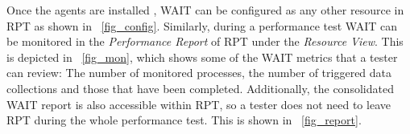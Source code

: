 \documentclass[runningheads,a4paper]{llncs}
\begin{document}
Once the agents are installed 
, WAIT can be configured as
any other resource in RPT as shown in \figurename ~\ref{fig_config}. Similarly,
during a performance test WAIT can be monitored %
in the
\emph{Performance Report} of RPT under the \emph{Resource View}. This is
depicted in \figurename ~\ref{fig_mon}, which shows some of the WAIT metrics
that a tester can review: The number of monitored processes, the number of triggered data collections
and those that have been completed. Additionally, the consolidated WAIT report
is also accessible within RPT, so a tester does not need to leave RPT during the
whole performance test. This is shown in \figurename ~\ref{fig_report}. 
\end{document}
